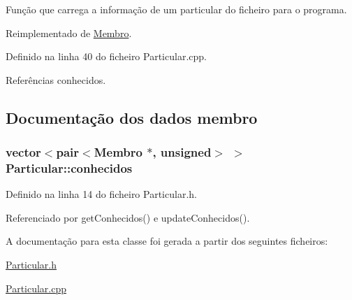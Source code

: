 Função que carrega a informação de um particular do ficheiro para o programa. 



Reimplementado de \hyperlink{class_membro_a67dab9bc0fd069a6e3204044005c197f}{Membro}.



Definido na linha 40 do ficheiro Particular.\+cpp.



Referências conhecidos.



\subsection{Documentação dos dados membro}
\hypertarget{class_particular_aa7275585be06abbb131d9acda989847d}{
\subsubsection[{conhecidos}]{\setlength{\rightskip}{0pt plus 5cm}vector$<$pair$<${\bf Membro} $\ast$, unsigned$>$ $>$ Particular\+::conhecidos\hspace{0.3cm}{\ttfamily [private]}}}\label{class_particular_aa7275585be06abbb131d9acda989847d}


Definido na linha 14 do ficheiro Particular.\+h.



Referenciado por get\+Conhecidos() e update\+Conhecidos().



A documentação para esta classe foi gerada a partir dos seguintes ficheiros\+:\begin{DoxyCompactItemize}
\item 
\hyperlink{_particular_8h}{Particular.\+h}\item 
\hyperlink{_particular_8cpp}{Particular.\+cpp}\end{DoxyCompactItemize}
